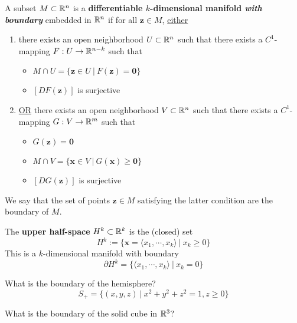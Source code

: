\begin{definition}
    A subset $M \subset \mathbb{R}^n$ is a \textbf{differentiable $k$-dimensional manifold \textit{with boundary}} embedded in $\mathbb{R}^n$  if for all $\bm{z} \in M$, \underline{either}
    
    \begin{enumerate}
        \item  there exists an open neighborhood $U \subset \mathbb{R}^n$ such that there exists a $C^1$-mapping $F : U \to \mathbb{R}^{n-k}$ such that
                \begin{itemize}
            \item $M \cap U = \{\bm{z} \in U \ | \ F(\bm{z}) = \bm{0} \}$
            \item $[DF(\bm{z})]$ is surjective
        \end{itemize}

        \item \underline{OR} there exists an open neighborhood $V \subset \mathbb{R}^n$ such that there exists a $C^1$-mapping $G : V \to \mathbb{R}^{m}$ such that
        \begin{itemize}
            \item $G(\bm{z}) = \bm{0}$
            \item $M \cap V = \{\bm{x} \in V \ | \ G(\bm{x}) \geq \bm{0} \}$
            \item $[DG(\bm{z})]$ is surjective
        \end{itemize}
    \end{enumerate}

    We say that the set of points $\bm{z} \in M$ satisfying the latter condition are the boundary of $M$.  
    \end{definition}

\begin{example}
    The \textbf{upper half-space} $H^k \subset \mathbb{R}^k$ is the (closed) set $$H^k := \{ \bm{x} = \langle x_1, \cdots, x_k \rangle \ | \ x_k \geq 0\}$$
    This is a $k$-dimensional manifold with boundary $$\partial H^k =\{ \langle x_1, \cdots, x_k \rangle \ | \ x_k = 0\} $$
    \end{example}

\begin{example}
     What is the boundary of the hemisphere? $$S_+ = \{(x,y,z) \ | \ x^2 + y^2 + z^2 = 1, z \geq 0\}$$
\end{example}

\begin{example}
    
    What is the boundary of the solid cube in $\mathbb{R}^3$?
\end{example}

